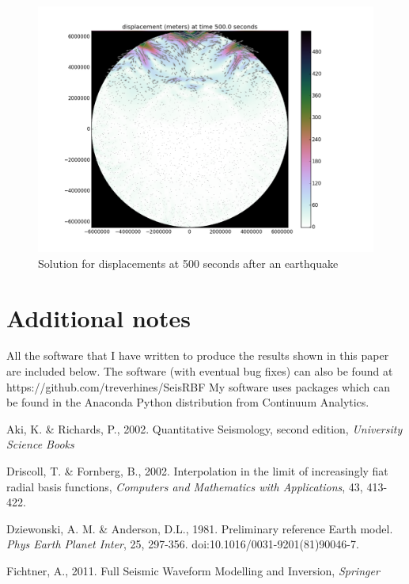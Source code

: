 \documentclass[12pt]{article}
\newcommand{\pythonscript}[2]{\begin{itemize}
                              \item[]
                              \end{itemize}}
\begin{document}
\begin{figure}
\includegraphics[scale=0.45]{figures/500s}
\centering
\caption{Solution for displacements at 500 seconds after an earthquake}
\end{figure}

\section*{Additional notes}
  All the software that I have written to produce the results shown in
  this paper are included below.  The software (with eventual bug
  fixes) can also be found at https://github.com/treverhines/SeisRBF
  My software uses packages which can be found in the Anaconda Python
  distribution from Continuum Analytics.  


\begin{thebibliography}{}
   Aki, K. \& Richards, P.,
    2002. Quantitative Seismology, second edition, \textit{University
      Science Books}


   Driscoll, T. \& Fornberg, B.,
    2002. Interpolation in the limit of increasingly fiat radial basis
    functions, \textit{Computers and Mathematics with Applications},
    43, 413-422.

   Dziewonski, A. M. \&
    Anderson, D.L., 1981. Preliminary reference Earth
    model. \textit{Phys Earth Planet Inter}, 25,
    297-356. doi:10.1016/0031-9201(81)90046-7.

   Fichtner, A., 2011. Full Seismic
    Waveform Modelling and Inversion, \textit{Springer}
\end{thebibliography}
\end{document}
